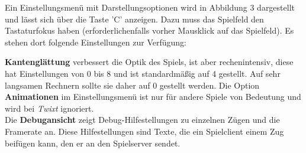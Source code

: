 \documentclass[a4paper, ngerman]{scrartcl}
\begin{document}
	Ein Einstellungsmenü mit Darstellungsoptionen wird in Abbildung 3 dargestellt
	und lässt sich über die Taste 'C' anzeigen. Dazu muss das
Spielfeld den Tastaturfokus haben (erforderlichenfalls
vorher Mausklick auf das Spielfeld). Es stehen dort
folgende Einstellungen zur Verfügung: 

\textbf{Kantenglättung} verbessert die Optik des
Spiels, ist aber rechenintensiv, diese hat Einstellungen von 0 bis 8 und ist
standardmäßig auf 4 gestellt.
Auf sehr langsamen Rechnern sollte sie daher auf 0 gestellt werden. Die Option
\textbf{Animationen} im Einstellungsmenü ist nur für andere Spiele von
Bedeutung und wird bei \emph{Twixt} ignoriert.\\
Die \textbf{Debugansicht} zeigt Debug-Hilfestellungen zu einzelnen Zügen und
die Framerate an.
Diese Hilfestellungen sind Texte, die ein Spielclient einem Zug beifügen kann, den er
an den Spielserver sendet.
	
\end{document}
